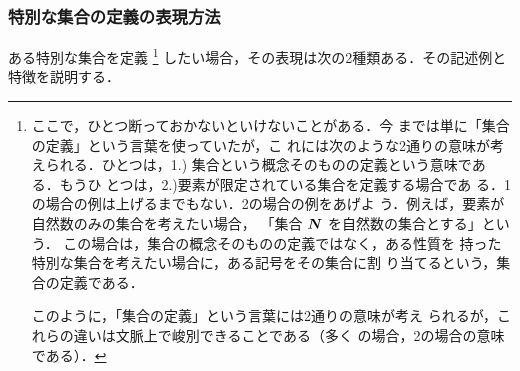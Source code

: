                 \subsubsection{特別な集合の定義の表現方法}
                    ある特別な集合を定義
                        \footnote{
                            ここで，ひとつ断っておかないといけないことがある．今
                            までは単に「集合の定義」という言葉を使っていたが，こ
                            れには次のような2通りの意味が考えられる．ひとつは，1.)
                            集合という概念そのものの定義という意味である．もうひ
                            とつは，2.)要素が限定されている集合を定義する場合であ
                            る．1の場合の例は上げるまでもない．2の場合の例をあげよ
                            う．例えば，要素が自然数のみの集合を考えたい場合，
                            「集合 $\boldsymbol{N}$ を自然数の集合とする」という．
                            この場合は，集合の概念そのものの定義ではなく，ある性質を
                            持った特別な集合を考えたい場合に，ある記号をその集合に割
                            り当てるという，集合の定義である．

                            このように，「集合の定義」という言葉には2通りの意味が考え
                            られるが，これらの違いは文脈上で峻別できることである（多く
                            の場合，2の場合の意味である）．
                        }
                    したい場合，その表現は次の2種類ある．その記述例と特徴を説明する．
                        \\
